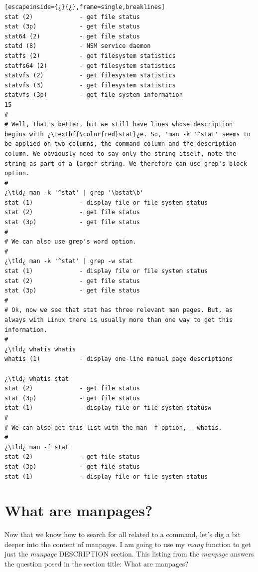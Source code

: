 \begin{lstlisting}[escapeinside={¿}{¿},frame=single,breaklines]
stat (2)             - get file status
stat (3p)            - get file status
stat64 (2)           - get file status
statd (8)            - NSM service daemon
statfs (2)           - get filesystem statistics
statfs64 (2)         - get filesystem statistics
statvfs (2)          - get filesystem statistics
statvfs (3)          - get filesystem statistics
statvfs (3p)         - get file system information
15
#
# Well, that's better, but we still have lines whose description begins with ¿\textbf{\color{red}stat}¿e. So, 'man -k '^stat' seems to be applied on two columns, the command column and the description column. We obviously need to say only the string itself, note the string as part of a larger string. We therefore can use grep's block option.
#
¿\tld¿ man -k '^stat' | grep '\bstat\b'
stat (1)             - display file or file system status
stat (2)             - get file status
stat (3p)            - get file status
#
# We can also use grep's word option.
#
¿\tld¿ man -k '^stat' | grep -w stat
stat (1)             - display file or file system status
stat (2)             - get file status
stat (3p)            - get file status
#
# Ok, now we see that stat has three relevant man pages. But, as always with Linux there is usually more than one way to get this information.
#
¿\tld¿ whatis whatis
whatis (1)           - display one-line manual page descriptions

¿\tld¿ whatis stat
stat (2)             - get file status
stat (3p)            - get file status
stat (1)             - display file or file system statusw
#
# We can also get this list with the man -f option, --whatis.
#
¿\tld¿ man -f stat
stat (2)             - get file status
stat (3p)            - get file status
stat (1)             - display file or file system status
\end{lstlisting}

\section{What are manpages?}

Now that we know how to search for all  related to a command, let's dig a bit deeper into the content of manpages. I am going to use my \emph{mang} function to get just the  \emph{manpage} \small{DESCRIPTION} section. This listing from the  \emph{manpage} answers the question posed in the section title: What are manpages?

